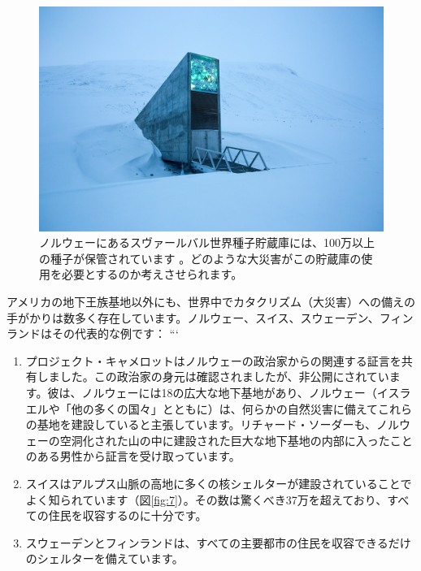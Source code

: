\documentclass[10pt,twocolumn,letterpaper]{article}
\begin{document}
\begin{figure}[t]
\begin{center}
   \includegraphics[width=1\linewidth]{svalbard.jpg}
\end{center}
   \caption{ノルウェーにあるスヴァールバル世界種子貯蔵庫には、100万以上の種子が保管されています \cite{24}。どのような大災害がこの貯蔵庫の使用を必要とするのか考えさせられます。}
\label{fig:8}
\label{fig:onecol}
\end{figure}

アメリカの地下王族基地以外にも、世界中でカタクリズム（大災害）への備えの手がかりは数多く存在しています。ノルウェー、スイス、スウェーデン、フィンランドはその代表的な例です：
```
\begin{flushleft}
\begin{enumerate}
    \item プロジェクト・キャメロットはノルウェーの政治家からの関連する証言を共有しました\cite{25,26}。この政治家の身元は確認されましたが、非公開にされています。彼は、ノルウェーには18の広大な地下基地があり、ノルウェー（イスラエルや「他の多くの国々」とともに）は、何らかの自然災害に備えてこれらの基地を建設していると主張しています。リチャード・ソーダーも、ノルウェーの空洞化された山の中に建設された巨大な地下基地の内部に入ったことのある男性から証言を受け取っています\cite{22}。
    \item スイスはアルプス山脈の高地に多くの核シェルターが建設されていることでよく知られています（図\ref{fig:7}）。その数は驚くべき37万を超えており、すべての住民を収容するのに十分です\cite{27}。
    \item スウェーデンとフィンランドは、すべての主要都市の住民を収容できるだけのシェルターを備えています\cite{27}。
\end{enumerate}
\end{flushleft}
\end{document}
